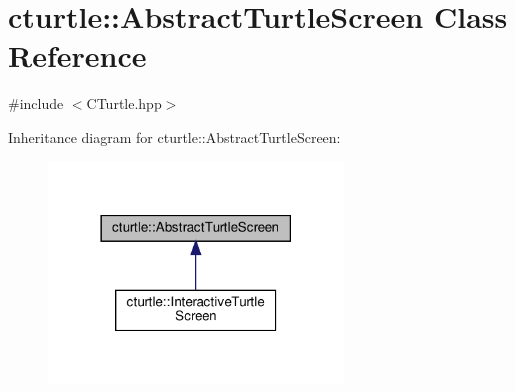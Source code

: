 \hypertarget{classcturtle_1_1AbstractTurtleScreen}{}\section{cturtle\+:\+:Abstract\+Turtle\+Screen Class Reference}
\label{classcturtle_1_1AbstractTurtleScreen}


{\ttfamily \#include $<$C\+Turtle.\+hpp$>$}



Inheritance diagram for cturtle\+:\+:Abstract\+Turtle\+Screen\+:\nopagebreak
\begin{figure}[H]
\begin{center}
\leavevmode
\includegraphics[width=222pt]{classcturtle_1_1AbstractTurtleScreen__inherit__graph}
\end{center}
\end{figure}
